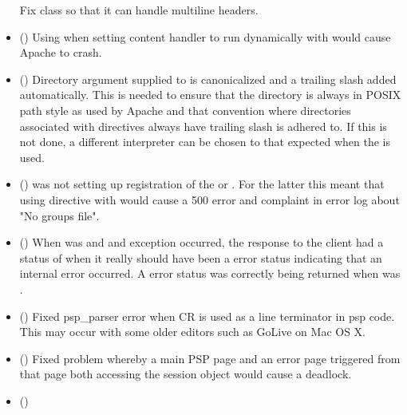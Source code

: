 \begin{itemize}
      Fix  class so that it can handle multiline headers.
    \item
      ()
      Using  when setting content handler to
      run dynamically with  would cause Apache to
      crash.
     \item
      ()
      Directory argument supplied to  is
      canonicalized and a trailing slash added automatically. This is
      needed to ensure that the directory is always in POSIX path style as
      used by Apache and that convention where directories associated with
      directives always have trailing slash is adhered to. If this is not
      done, a different interpreter can be chosen to that expected when the
       is used.
    \item
      ()
       was not setting up registration of the
       or . For the
      latter this meant that using  directive with
       would cause a 500 error and complaint in
      error log about "No groups file".
    \item
      ()
      When  was  and and exception occurred, the
      response to the client had a status of  when it really should
      have been a  error status indicating that an internal error
      occurred. A  error status was correctly being returned when
       was .
    \item
      ()
      Fixed psp_parser error when CR is used as a line terminator in psp code.
      This may occur with some older editors such as GoLive on Mac OS X.
    \item
      ()
      Fixed problem whereby a main PSP page and an error page triggered from
      that page both accessing the session object would cause a deadlock.
    \item
      ()

\end{itemize}
